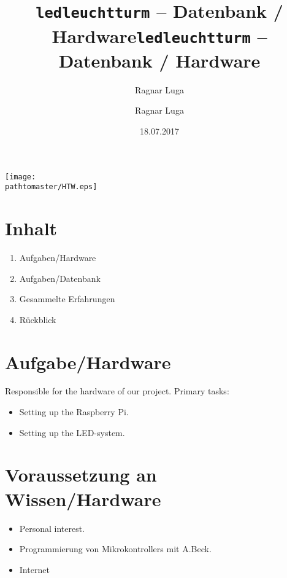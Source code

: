 \documentclass[ignorenonframetext, 11pt, table]{beamer}
\author{Ragnar Luga}
\title{\texttt{ledleuchtturm} -- Datenbank / Hardware}
\date{18.07.2017}
\gdef\pathtomaster{../_LaTeX_master}
\begin{document}
\author{Ragnar Luga}
\title{\texttt{ledleuchtturm} -- Datenbank / Hardware}

\begin{frame}[plain]
\begin{center}
\texttt{[image: \\pathtomaster/HTW.eps]}
\end{center}
\maketitle
\end{frame}

\section*{Inhalt}
\begin{frame}
\begin{enumerate}
\setlength\itemsep{0.2em}
\item Aufgaben/Hardware \pause 
\item Aufgaben/Datenbank \pause
\item Gesammelte Erfahrungen \pause
\item Rückblick
\end{enumerate}
\end{frame}

\section*{Aufgabe/Hardware}
\begin{frame}
Responsible for the hardware of our project. \pause
\newline\newline
Primary tasks:
\begin{itemize}
\item Setting up the Raspberry Pi. \pause
\item Setting up the LED-system.
\end{itemize}
\end{frame}

\section*{Voraussetzung an Wissen/Hardware}
\begin{frame}
\begin{itemize}
\item Personal interest. \pause
\item Programmierung von Mikrokontrollers mit A.Beck. \pause
\item Internet
\end{itemize}
\end{frame}
\end{document}
